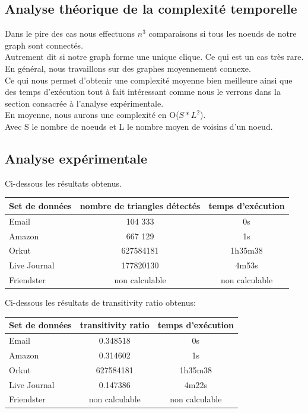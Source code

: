 \documentclass[a4paper,10pt]{report}
\begin{document}
\subsection{Analyse théorique de la complexité temporelle}
Dans le pire des cas nous effectuons $n^{3}$ comparaisons si tous les noeuds de notre graph sont connectés.
\\
Autrement dit si notre graph forme une unique clique. Ce qui est un cas très rare. 
\\
En général, nous travaillons sur des graphes moyennement connexe. 
\\
Ce qui nous permet d'obtenir une complexité moyenne bien meilleure ainsi que des temps d'exécution tout à fait intéressant comme nous le verrons dans la section consacrée à l'analyse expérimentale.
\\
\newline
En moyenne, nous aurons une complexité en O(\textbf{$S*L^2$}). 
\\
Avec S le nombre de noeuds et L le nombre moyen de voisins d'un noeud.
\clearpage
\subsection{Analyse expérimentale}
Ci-dessous les résultats obtenus.
\newline
\begin{center}
    \begin{tabular}{|l|c|c|}
    \hline
     Set de données & nombre de triangles détectés& temps d'exécution\\ \hline
     Email & 104 333& 0s\\ 
     Amazon &667 129& 1s\\ 
     Orkut & 627584181& 1h35m38 \\
     Live Journal &177820130 & 4m53s\\ 
     Friendster &non calculable & non calculable\\ 
     \hline
    \end{tabular}
\end{center}
Ci-dessous les résultats de transitivity ratio obtenus:
\\
\begin{center}
    \begin{tabular}{|l|c|c|}
    \hline
     Set de données & transitivity ratio & temps d'exécution\\ \hline
     Email & 0.348518& 0s\\ 
     Amazon &0.314602& 1s\\ 
     Orkut & 627584181& 1h35m38 \\
     Live Journal &0.147386 & 4m22s\\ 
     Friendster &non calculable & non calculable\\ 
     \hline
    \end{tabular}
\end{center}
\end{document}
